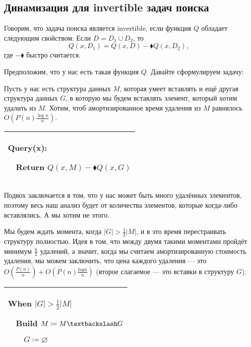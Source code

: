 \subsection{Динамизация для invertible задач поиска}
\begin{definition}
Говорим, что задача поиска является invertible, если функция $Q$ обладает следующим свойством:
Если $D=D_1\cup D_2$, то
$$Q(x,D_1)=Q(x,D)-\blacklozenge Q(x,D_2),$$
где $-\blacklozenge$ быстро считается.
\end{definition}

Предположим, что у нас есть такая функция $Q$. Давайте сформулируем задачу:

\begin{task}
Пусть у нас есть структура данных $M$, которая умеет вставлять и ещё другая структура данных $G$, в которую мы будем вставлять элемент, который хотим удалить из $M$. Хотим, чтоб амортизированное время удаления из $M$ равнялось $O\left(P(n)\frac{\log n}{n}\right)$.

\end{task}

\begin{tabular}{|p{5cm}|}
\hline
Query(x):

$\quad$Return $Q(x,M)-\blacklozenge Q(x,G)$\\
\hline
\end{tabular}


Подвох заключается в том, что у нас может быть много удалённых элементов, поэтому весь наш анализ будет от количества элементов, которые когда-либо вставлялись. А мы хотим не этого.

Мы будем ждать момента, когда $|G|>\frac{1}{2}|M|$, и в это время перестраивать структуру полностью. Идея в том, что между двумя такими моментами пройдёт минимум $\frac{n}{2}$ удалений, а значит, когда мы считаем амортизированную стоимость удаления, мы можем заключить, что цена каждого удаления — это
$O\left(\frac{P(n)}{n}\right)+O\left(P(n)\frac{log n}{n}\right)$ (второе слагаемое — это вставки в структуру $G$).

\begin{tabular}{|p{5cm}|}
\hline

When $|G|>\frac{1}{2}|M|$

$\quad$Build $M \coloneqq M\textbackslash G$

$\quad$$\quad$$G \coloneqq \varnothing$\\

\hline
\end{tabular}

